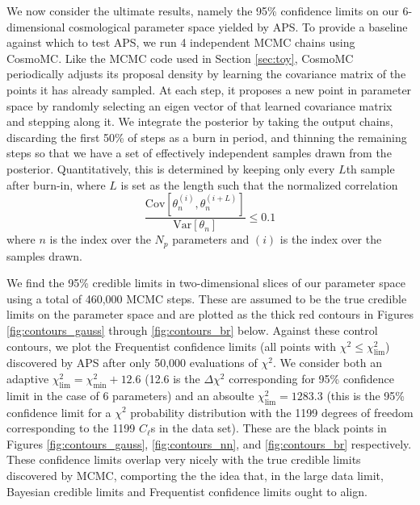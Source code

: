 \documentclass[useAMS,usenatbib]{aastex}
\begin{document}
We now consider the ultimate results, namely the 95\% confidence limits on
our 6-dimensional cosmological parameter space yielded by APS.
To provide a baseline against which to test APS, we run 4 independent MCMC
chains using CosmoMC.  Like the MCMC code used in Section \ref{sec:toy},
CosmoMC periodically adjusts its proposal density by learning the covariance
matrix of the points it has already sampled.  At each step, it proposes
a new point in parameter space by randomly selecting an eigen vector
of that learned covariance matrix and stepping along it.
We integrate the posterior by taking the output chains, discarding the first
50\% of steps as a burn in period, and thinning the remaining steps so that
we have a set of effectively independent samples drawn from the posterior.
Quantitatively, this is determined by keeping only every $L$th sample after
burn-in, where $L$ is set as the length such that the normalized correlation
\begin{equation}
\frac{\text{Cov}[\theta_n^{(i)},\theta_n^{(i+L)}]}
{\text{Var}[\theta_n]}\le 0.1
\end{equation}
where $n$ is the index over the $N_p$ parameters and $(i)$ is the index
over the samples drawn.

We find the 95\% credible
limits in two-dimensional slices of our parameter space using
a total of 460,000 MCMC steps.  These are assumed to be the
true credible limits on the parameter space and are plotted
as the thick red
contours in Figures \ref{fig:contours_gauss} through 
\ref{fig:contours_br} 
below.  Against these control contours, we plot the Frequentist
confidence limits (all points with $\chi^2\le\chi^2_\text{lim}$)
discovered by APS after only 50,000 evaluations of $\chi^2$.
We consider both an adaptive $\chi^2_\text{lim}=\chi^2_\text{min}+12.6$
(12.6 is the $\Delta\chi^2$ corresponding for 95\% confidence limit in the case
of 6 parameters)
and an absoulte $\chi^2_\text{lim}=1283.3$ (this is the 95\% confidence limit
for a $\chi^2$ probability distribution with the 1199 degrees of freedom corresponding
to the 1199 $C_\ell$s in the data set).
These are the black points in Figures \ref{fig:contours_gauss}, \ref{fig:contours_nn},
and \ref{fig:contours_br} respectively.  These confidence limits overlap very nicely
with the true credible limits discovered by MCMC,
comporting the the idea that, in the large data limit, Bayesian credible limits
and Frequentist confidence limits ought to align.
\end{document}

